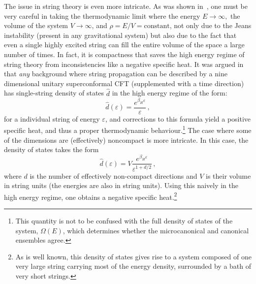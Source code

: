 \documentclass[a4paper,11pt]{article}
\begin{document}
The issue in string theory is even more intricate.
As was shown in~\cite{Deo:1988jj}, one must be very careful in taking the thermodynamic limit where the energy $E\rightarrow \infty,$ the volume of the system $V\rightarrow \infty$, and $\rho=E/V=\text{constant}$, not only due to the Jeans instability (present in any gravitational system) but also due to the fact that even a single highly excited string can fill 
the entire volume of the space a large number of times.
In  fact, it is compactness that saves the high energy regime of string theory from inconsistencies like a negative specific heat. 
It was argued in~\cite{Brandenberger:1988aj} that \textit{any} background where string propagation can be 
described by a nine dimensional unitary superconformal CFT (supplemented with a time direction)  has single-string density of states $\hat{d}$ in the high energy regime of the form:
\begin{equation}\label{eq:compact-dos}
    \hat{d}(\varepsilon)=\frac{e^{\beta_H \varepsilon}}{\varepsilon}\, ,
\end{equation}
for a individual string of energy $\varepsilon$, and corrections to this formula yield a positive specific heat, and thus a proper thermodynamic behaviour.\footnote{
This quantity is not to be confused with the full density of states of the system, $\Omega(E)$, which determines whether the microcanonical and canonical ensembles agree.} The case where some of the dimensions are (effectively) noncompact is more intricate. 
In this case, the density of states takes the form
\begin{equation}\label{eq:noncompact-dos}
    \hat{d}(\varepsilon)=V\frac{e^{\beta_H \varepsilon}}{\varepsilon^{1+d/2}}\, ,
\end{equation}
where $d$ is the number of effectively non-compact directions and $V$ is their volume in string units (the energies 
are also in string units). 
Using this naively in the high energy regime, one obtains a negative specific heat.\footnote{
As is well known, this density of states gives rise to a system composed of one very large string carrying most of the energy density, surrounded by a bath of very short strings.}
\end{document}
